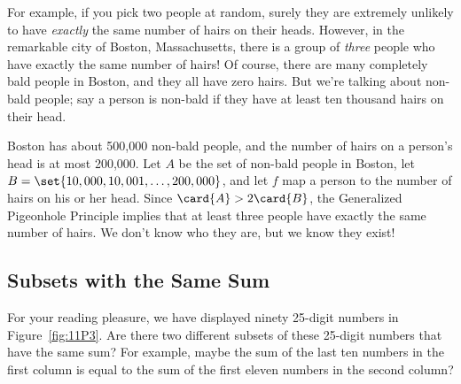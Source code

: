 For example, if you pick two people at random, surely they are
extremely unlikely to have \emph{exactly} the same number of hairs on
their heads.  However, in the remarkable city of Boston,
Massachusetts, there is a group of \emph{three} people who have
exactly the same number of hairs!  Of course, there are many
completely bald people in Boston, and they all have zero hairs.  But
we're talking about non-bald people; say a person is non-bald if they
have at least ten thousand hairs on their head.

Boston has about 500,000 non-bald people, and the number of hairs on a
person's head is at most 200,000.  Let $A$ be the set of non-bald people
in Boston, let $B = \set{10,000, 10,001, \dots, 200,000}$, and let $f$ map
a person to the number of hairs on his or her head.  Since $\card{A} > 2
\card{B}$, the Generalized Pigeonhole Principle implies that at least
three people have exactly the same number of hairs.  We don't know who
they are, but we know they exist!

\subsection{Subsets with the Same Sum}

For your reading pleasure, we have displayed ninety 25-digit numbers
in Figure~\ref{fig:11P3}.  Are there two different subsets of these
25-digit numbers that have the same sum? For example, maybe the sum of
the last ten numbers in the first column is equal to the sum of the
first eleven numbers in the second column?

